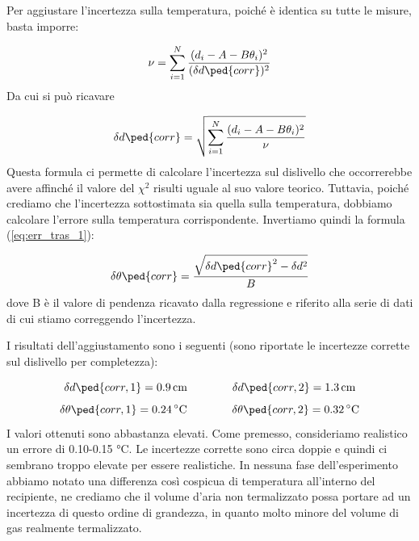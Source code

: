 Per aggiustare l'incertezza sulla temperatura, poiché è identica su tutte le misure, basta imporre:

\begin{equation}
    \nu = \sum_{i=1}^{N} \frac{(d_i - A - B\theta_i)^2}{(\delta d\ped{corr})^2}
\end{equation}
%
Da cui si può ricavare

\begin{equation}
    \delta d\ped{corr} = \sqrt{\sum_{i=1}^{N} \frac{(d_i - A - B\theta_i)^2}{\nu}}
    \label{eq:corr_err}
\end{equation}
%
Questa formula ci permette di calcolare l'incertezza sul dislivello che occorrerebbe avere affinché il valore del $\chi^2$
risulti uguale al suo valore teorico. Tuttavia, poiché crediamo che l'incertezza sottostimata sia quella sulla temperatura,
dobbiamo calcolare l'errore sulla temperatura corrispondente. Invertiamo quindi la formula (\ref{eq:err_tras_1}):

\begin{equation}
    \delta \theta\ped{corr} = \frac{\sqrt{\delta d\ped{corr}^2 - \delta d^2}}{B}
    \label{eq:corr_err_theta}
\end{equation}
%
dove B è il valore di pendenza ricavato dalla regressione e riferito alla serie di dati di cui stiamo correggendo l'incertezza.

I risultati dell'aggiustamento sono i seguenti (sono riportate le incertezze corrette sul dislivello per completezza):

\begin{equation}
    \delta d\ped{corr,1} = \SI{0.9}{\centi\meter} \qquad \qquad \delta d\ped{corr,2} = \SI{1.3}{\centi\metre}
\end{equation}
\begin{equation}
    \delta \theta\ped{corr,1} = \SI{0.24}{\celsius} \qquad \qquad \delta \theta\ped{corr,2} = \SI{0.32}{\celsius}
\end{equation}
%
I valori ottenuti sono abbastanza elevati. Come premesso, consideriamo realistico un errore di 0.10-0.15 \si{\celsius}.
Le incertezze corrette sono circa doppie e quindi ci sembrano troppo elevate per essere realistiche. In nessuna fase
dell'esperimento abbiamo notato una differenza così cospicua di temperatura all'interno del recipiente, ne crediamo che
il volume d'aria non termalizzato possa portare ad un incertezza di questo ordine di grandezza, in quanto molto minore
del volume di gas realmente termalizzato.

